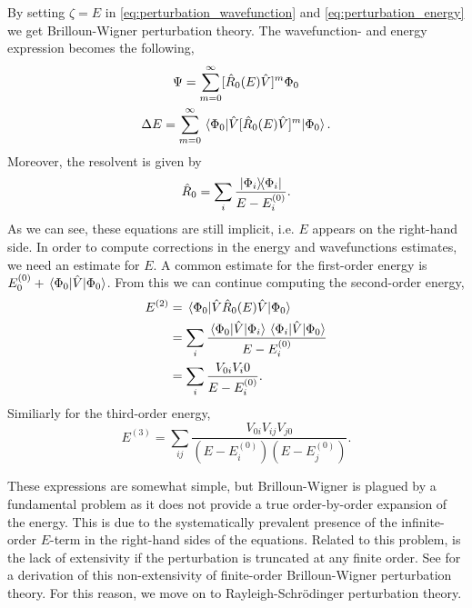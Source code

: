 By setting $\zeta = E$ in \autoref{eq:perturbation_wavefunction} and 
\autoref{eq:perturbation_energy} we get Brilloun-Wigner
perturbation theory\cite{brillouin1932problemes,wigner1935modification}. 
The wavefunction- and energy expression becomes the following,
\begin{gather}
    \Psi = \sum_{m=0}^\infty [\hat{R}_0(E) \hat{V}]^m \Phi_0 \\
    \Delta E = \sum_{m=0}^\infty 
        \mel*{\Phi_0}{\hat{V}[\hat{R}_0(E)\hat{V}]^m}{\Phi_0}.
\end{gather}
Moreover, the resolvent is given by 
\begin{equation}
    \hat{R}_0 = \sum_i \frac{\dyad{\Phi_i}{\Phi_i}}{E - E_i^{(0)}}.
\end{equation}
As we can see, these equations are still implicit, i.e. $E$ appears on the 
right-hand side. In order to compute corrections in the energy and wavefunctions 
estimates, we need an estimate for $E$. A common estimate for the first-order 
energy is $E^{(0)}_0 + \mel*{\Phi_0}{\hat{V}}{\Phi_0}$. From this we can continue 
computing the second-order energy,
\begin{equation}
    \begin{aligned}
        E^{(2)}
            &= \mel*{\Phi_0}{\hat{V}\hat{R}_0(E)\hat{V}}{\Phi_0} \\
            &= \sum_i \frac{\mel*{\Phi_0}{\hat{V}}{\Phi_i}
                \mel*{\Phi_i}{\hat{V}}{\Phi_0}
            }{E - E^{(0)}_i} \\
            &= \sum_i \frac{V_{0i}V_i0}{E - E^{(0)}_i}.
    \end{aligned}
\end{equation}
Similiarly for the third-order energy,
\begin{equation}
    E^{(3)} = \sum_{ij} \frac{V_{0i}V_{ij}V_{j0}}{(E - E^{(0)}_i)(E - E^{(0)}_j)}.
\end{equation}

These expressions are somewhat simple, but Brilloun-Wigner is plagued by a fundamental
problem as it does not provide a true order-by-order expansion of the energy. This is 
due to the systematically prevalent presence of the infinite-order $E$-term in the right-hand 
sides of the equations. Related to this problem, is the lack of extensivity if the 
perturbation is truncated at any finite order. See 
\citeauthor{shavitt2009many}\cite{shavitt2009many} for a derivation of this
non-extensivity of finite-order Brilloun-Wigner perturbation theory. For this 
reason, we move on to Rayleigh-Schrödinger perturbation theory.

